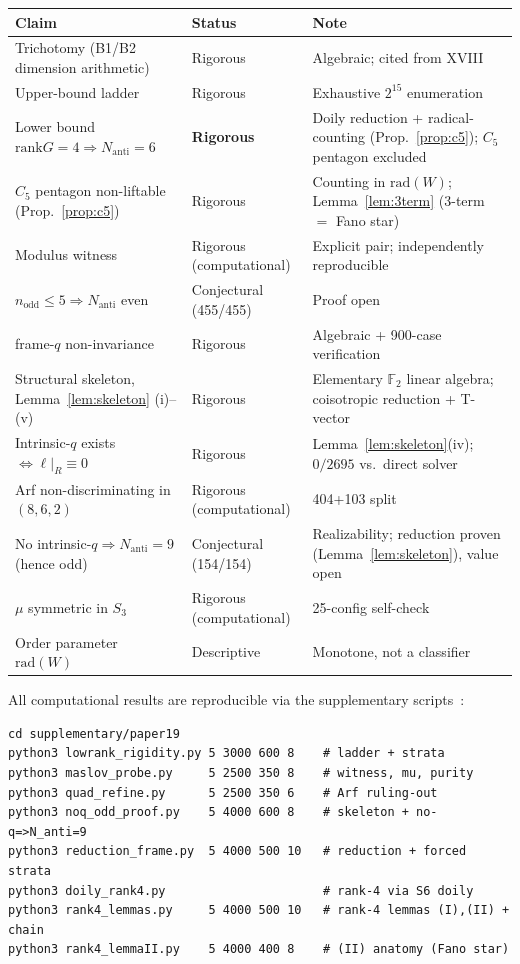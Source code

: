 \documentclass[11pt,a4paper]{article}
\theoremstyle{remark}
\newcommand{\rad}{\mathrm{rad}}
\newcommand{\rank}{\mathrm{rank}}
\newcommand{\Nanti}{N_{\mathrm{anti}}}
\begin{document}
\begin{center}
\begin{tabular}{p{5cm}p{3.5cm}p{5cm}}
\toprule
Claim & Status & Note \\
\midrule
Trichotomy (B1/B2 dimension arithmetic) & Rigorous & Algebraic; cited from XVIII \\
Upper-bound ladder & Rigorous & Exhaustive $2^{15}$ enumeration \\
Lower bound $\rank G=4\Rightarrow\Nanti=6$ & \textbf{Rigorous} & Doily reduction + radical-counting (Prop.~\ref{prop:c5}); $C_5$ pentagon excluded \\
$C_5$ pentagon non-liftable (Prop.~\ref{prop:c5}) & Rigorous & Counting in $\rad(W)$; Lemma~\ref{lem:3term} (3-term $=$ Fano star) \\
Modulus witness & Rigorous (computational) & Explicit pair; independently reproducible \\
$n_{\mathrm{odd}}\le5\Rightarrow\Nanti$ even & Conjectural (455/455) & Proof open \\
frame-$q$ non-invariance & Rigorous & Algebraic + 900-case verification \\
Structural skeleton, Lemma~\ref{lem:skeleton} (i)--(v) & Rigorous & Elementary $\mathbb F_2$ linear algebra; coisotropic reduction + T-vector \\
Intrinsic-$q$ exists $\iff\ell|_R\equiv0$ & Rigorous & Lemma~\ref{lem:skeleton}(iv); $0/2695$ vs.\ direct solver \\
Arf non-discriminating in $(8,6,2)$ & Rigorous (computational) & 404+103 split \\
No intrinsic-$q\Rightarrow\Nanti=9$ (hence odd) & Conjectural (154/154) & Realizability; reduction proven (Lemma~\ref{lem:skeleton}), value open \\
$\mu$ symmetric in $S_3$ & Rigorous (computational) & 25-config self-check \\
Order parameter $\rad(W)$ & Descriptive & Monotone, not a classifier \\
\bottomrule
\end{tabular}
\end{center}

All computational results are reproducible via the supplementary
scripts~\cite{PaperXIXsuppl}:
\begin{verbatim}
cd supplementary/paper19
python3 lowrank_rigidity.py 5 3000 600 8    # ladder + strata
python3 maslov_probe.py     5 2500 350 8    # witness, mu, purity
python3 quad_refine.py      5 2500 350 6    # Arf ruling-out
python3 noq_odd_proof.py    5 4000 600 8    # skeleton + no-q=>N_anti=9
python3 reduction_frame.py  5 4000 500 10   # reduction + forced strata
python3 doily_rank4.py                      # rank-4 via S6 doily
python3 rank4_lemmas.py     5 4000 500 10   # rank-4 lemmas (I),(II) + chain
python3 rank4_lemmaII.py    5 4000 400 8    # (II) anatomy (Fano star)
\end{verbatim}
\end{document}
